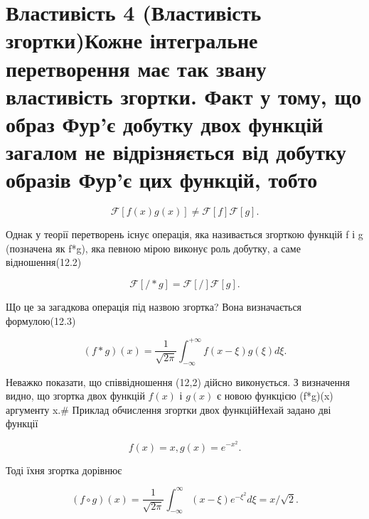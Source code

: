 \documentclass[
  ukrainian,
]{article}
\begin{document}
\section{Властивість 4 (Властивість згортки)Кожне інтегральне
перетворення має так звану властивість згортки. Факт у тому, що образ
Фур'є добутку двох функцій загалом не відрізняється від добутку образів
Фур'є цих функцій,
тобто}\label{ux432ux43bux430ux441ux442ux438ux432ux456ux441ux442ux44c-4-ux432ux43bux430ux441ux442ux438ux432ux456ux441ux442ux44c-ux437ux433ux43eux440ux442ux43aux438ux43aux43eux436ux43dux435-ux456ux43dux442ux435ux433ux440ux430ux43bux44cux43dux435-ux43fux435ux440ux435ux442ux432ux43eux440ux435ux43dux43dux44f-ux43cux430ux454-ux442ux430ux43a-ux437ux432ux430ux43dux443-ux432ux43bux430ux441ux442ux438ux432ux456ux441ux442ux44c-ux437ux433ux43eux440ux442ux43aux438.-ux444ux430ux43aux442-ux443-ux442ux43eux43cux443-ux449ux43e-ux43eux431ux440ux430ux437-ux444ux443ux440ux454-ux434ux43eux431ux443ux442ux43aux443-ux434ux432ux43eux445-ux444ux443ux43dux43aux446ux456ux439-ux437ux430ux433ux430ux43bux43eux43c-ux43dux435-ux432ux456ux434ux440ux456ux437ux43dux44fux454ux442ux44cux441ux44f-ux432ux456ux434-ux434ux43eux431ux443ux442ux43aux443-ux43eux431ux440ux430ux437ux456ux432-ux444ux443ux440ux454-ux446ux438ux445-ux444ux443ux43dux43aux446ux456ux439-ux442ux43eux431ux442ux43e}

\[
\mathcal{F}[f(x)g(x)] \neq \mathcal{F}[f]\mathcal{F}[g].
\]

Однак у теорії перетворень існує операція, яка називається згорткою
функцій f і g (позначена як f*g), яка певною мірою виконує роль добутку,
а саме відношення(12.2)

\[
\mathcal{F}[/*g] = \mathcal{F}[/]\mathcal{F}[g].
\]

Що це за загадкова операція під назвою згортка? Вона визначається
формулою(12.3)

\[
(f*g)(x) = \frac{1}{\sqrt{2\pi}} \int_{-\infty}^{+\infty} f(x-\xi) g(\xi) d\xi.
\]

Неважко показати, що співвідношення (12,2) дійсно виконується. З
визначення видно, що згортка двох функцій \(f(x)\) і \(g(x)\) є новою
функцією (f*g)(x) аргументу x.\# Приклад обчислення згортки двох
функційНехай задано дві функції

\[
f(x) = x,
g(x) = e^{-x^2}.
\]

Тоді їхня згортка дорівнює

\[
(f \circ g)(x) = \frac{1}{\sqrt{2\pi}} \int_{-\infty}^{\infty} (x - \xi) e^{-\xi^2} d\xi = x/\sqrt{2}.
\]
\end{document}
